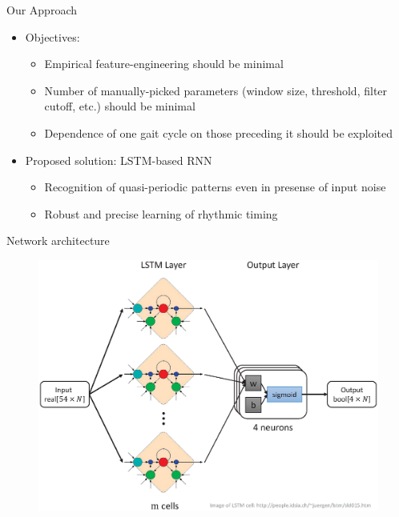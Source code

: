 \documentclass{beamer}
\begin{document}
\begin{frame}{Our Approach}
    \begin{itemize}
        \item Objectives:
        \begin{itemize}
            \item Empirical feature-engineering should be minimal
            \item Number of manually-picked parameters (window size, threshold, filter cutoff, etc.) should be minimal
            \item Dependence of one gait cycle on those preceding it should be exploited
        \end{itemize}
        \item Proposed solution: LSTM-based RNN
        \begin{itemize}
            \item Recognition of quasi-periodic patterns even in presense of input noise
            \item Robust and precise learning of rhythmic timing
        \end{itemize}
    \end{itemize}
\end{frame}

\begin{frame}{Network architecture}
    \begin{figure}[H]
        \begin{center}
        \includegraphics[height=.77\textheight]{figures/network.eps} \\
        \end{center}
    \end{figure}
\end{frame}
\end{document}
